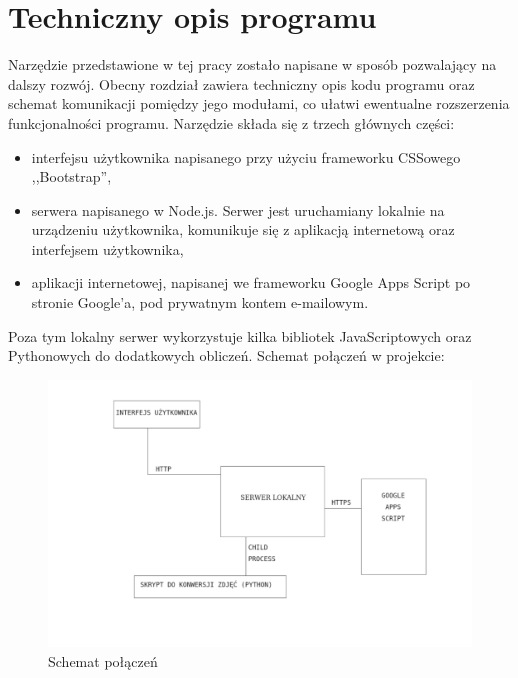 \chapter{Techniczny opis programu} 
Narzędzie przedstawione w tej pracy zostało napisane w sposób pozwalający na dalszy rozwój. Obecny rozdział zawiera techniczny opis kodu programu oraz schemat komunikacji pomiędzy jego modułami, co ułatwi ewentualne rozszerzenia funkcjonalności programu.
\ind Narzędzie składa się z trzech głównych części:
\begin{itemize}
\item interfejsu użytkownika napisanego przy użyciu frameworku CSSowego ,,Bootstrap'',
\item serwera napisanego w Node.js. Serwer jest uruchamiany lokalnie na urządzeniu użytkownika, komunikuje się z aplikacją internetową oraz interfejsem użytkownika,
\item aplikacji internetowej, napisanej we frameworku Google Apps Script po stronie Google'a, pod prywatnym kontem e-mailowym.


\end{itemize}
Poza tym lokalny serwer wykorzystuje kilka bibliotek JavaScriptowych oraz Pythonowych do dodatkowych obliczeń. Schemat połączeń w projekcie:
\begin{figure}[H]
  \centering
  \includegraphics[scale=0.6]{schemat.png}
  \caption{Schemat połączeń}
  \label{fig:1}
\end{figure}
